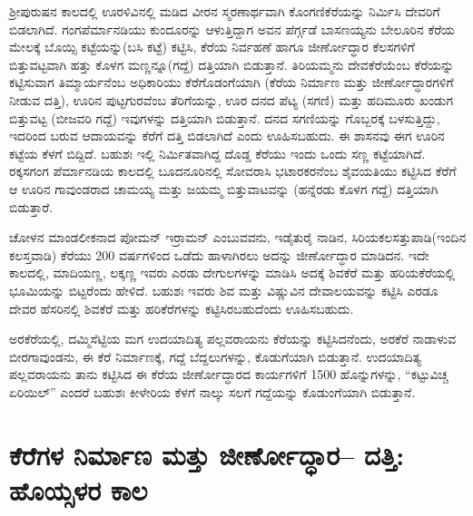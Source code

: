 ಶ‍್ರೀಪುರುಷನ ಕಾಲದಲ್ಲಿ ಊರಳಿವಿನಲ್ಲಿ ಮಡಿದ ವೀರನ ಸ್ಮರಣಾರ್ಥವಾಗಿ ಕೊಂಗಣಿಕೆರೆಯನ್ನು ನಿರ್ಮಿಸಿ ದೇವರಿಗೆ ಬಿಡಲಾಗಿದೆ. ಗಂಗಪೆರ್ಮಾನಡಿಯು ಕುಂದೂರನ್ನು ಆಳುತ್ತಿದ್ದಾಗ ಅವನ ಪೆರ್ಗ್ಗಡೆ ಬಾಸಣಯ್ಯನು ಬೇಲೂರಿನ ಕೆರೆಯ ಮೇಲಕ್ಕೆ ಬೊಯ್ಸಿ ಕಟ್ಟೆಯನ್ನು(ಬಸಿ ಕಟ್ಟೆ) ಕಟ್ಟಿಸಿ, ಕೆರೆಯ ನಿರ್ವಹಣೆ ಹಾಗೂ ಜೀರ್ಣೋದ್ಧಾರ ಕೆಲಸಗಳಿಗೆ ಬಿತ್ತುವಟ್ಟವಾಗಿ ಹತ್ತು ಕೊಳಗ ಮಣ್ಣನ್ನೂ(ಗದ್ದೆ) ದತ್ತಿಯಾಗಿ ಬಿಡುತ್ತಾನೆ. ತಿರಿಯಮ್ಮನು ದೇವಕೆರೆಯೆಂಬ ಕೆರೆಯನ್ನು ಕಟ್ಟಿಸುವಾಗ ತಿಮ್ಮಾರ್ಯನೆಂಬ ಅಧಿಕಾರಿಯು ಕೆರೆಗೊಡಂಗೆಯಾಗಿ (ಕೆರೆಯ ನಿರ್ಮಾಣ ಮತ್ತು ಜೀರ್ಣೋದ್ಧಾರಗಳಿಗೆ ನೀಡುವ ದತ್ತಿ), ಊರಿನ ಪುಟ್ಟಗುರವೆಂಬ ತೆರಿಗೆಯನ್ನು, ಊರ ದನದ ಪೆಟ್ಯ (ಸಗಣಿ) ಮತ್ತು ಹದಿಮೂರು ಖಂಡುಗ ಬಿತ್ತುವಟ್ಟ (ಬೀಜವರಿ ಗದ್ದೆ) ಇವುಗಳನ್ನು ದತ್ತಿಯಾಗಿ ಬಿಡುತ್ತಾನೆ. ದನದ ಸಗಣಿಯನ್ನು ಗೊಬ್ಬರಕ್ಕೆ ಬಳಸುತ್ತಿದ್ದು, ಇದರಿಂದ ಬರುವ ಆದಾಯವನ್ನು ಕೆರೆಗೆ ದತ್ತಿ ಬಿಡಲಾಗಿದೆ ಎಂದು ಊಹಿಸಬಹುದು. ಈ ಶಾಸನವು ಈಗ ಊರಿನ ಕಟ್ಟೆಯ ಕೆಳಗೆ ಬಿದ್ದಿದೆ. ಬಹುಶಃ ಇಲ್ಲಿ ನಿರ್ಮಿತವಾಗಿದ್ದ ದೊಡ್ಡ ಕೆರೆಯು ಇಂದು ಒಂದು ಸಣ್ಣ ಕಟ್ಟೆಯಾಗಿದೆ. ರಕ್ಕಸಗಂಗ ಪೆರ್ಮಾನಡಿಯ ಕಾಲದಲ್ಲಿ ಬೂದನೂರಿನಲ್ಲಿ ಸೋವರಾಸಿ ಭಟಾರಕರನೆಂಬ ಶೈವಯತಿಯು ಕಟ್ಟಿಸಿದ ಕೆರೆಗೆ ಆ ಊರಿನ ಗಾವುಂಡರಾದ ಚಾಮಯ್ಯ ಮತ್ತು ಜಯಮ್ಮ ಬಿತ್ತುವಾಟವನ್ನು (ಹನ್ನೆರಡು ಕೊಳಗ ಗದ್ದೆ) ದತ್ತಿಯಾಗಿ ಬಿಡುತ್ತಾರೆ.

ಚೋಳನ ಮಾಂಡಲೀಕನಾದ ಪೋಮನ್​ ಇರ್ರಾಮನ್​ ಎಂಬುವವನು, ಇಡೈತುರೈ ನಾಡಿನ, ಸಿರಿಯಕಲಸತ್ತುಪಾಡಿ(ಇಂದಿನ ಕಲಸ್ತವಾಡಿ) ಕೆರೆಯು 200 ವರ್ಷಗಳಿಂದ ಒಡೆದು ಹಾಳಾಗಿರಲು ಅದನ್ನು ಜೀರ್ಣೋದ್ಧಾರ ಮಾಡಿದನ. ಇದೇ ಕಾಲದಲ್ಲಿ, ಮಾದಿಯಣ್ಣ, ಲಕ್ಕಣ್ಣ ಇವರು ಎರಡು ದೇಗುಲಗಳನ್ನು ಮಾಡಿಸಿ ಅದಕ್ಕೆ ಶಿವಕೆರೆ ಮತ್ತು ಹರಿಯಕೆರೆಯಲ್ಲಿ ಭೂಮಿಯನ್ನು ಬಿಟ್ಟರೆಂದು ಹೇಳಿದೆ. ಬಹುಶಃ ಇವರು ಶಿವ ಮತ್ತು ವಿಷ್ಣುವಿನ ದೇವಾಲಯವನ್ನು ಕಟ್ಟಿಸಿ ಎರಡೂ ದೇವರ ಹೆಸರಿನಲ್ಲಿ ಶಿವಕೆರೆ ಮತ್ತು ಹರಿಕೆರೆಗಳನ್ನು ಕಟ್ಟಿಸಿರಬಹುದೆಂದು ಊಹಿಸಬಹುದು.

ಅರಕೆರೆಯಲ್ಲಿ, ದಮ್ಮಿಸೆಟ್ಟಿಯ ಮಗ ಉದಯಾದಿತ್ಯ ಪಲ್ಲವರಾಯನು ಕೆರೆಯನ್ನು ಕಟ್ಟಿಸಿದನೆಂದು, ಅರಕೆರೆ ನಾಡಾಳುವ ಬೀರಗಾವುಂಡನು, ಈ ಕೆರೆ ನಿರ್ಮಾಣಕ್ಕೆ, ಗದ್ದೆ ಬೆದ್ದಲುಗಳನ್ನು, ಕೊಡುಗೆಯಾಗಿ ಬಿಡುತ್ತಾನೆ. ಉದಯಾದಿತ್ಯ ಪಲ್ಲವರಾಯನು ತಾನು ಕಟ್ಟಿಸಿದ ಈ ಕೆರೆಯ ಜೀರ್ಣೋದ್ಧಾರದ ಕಾರ್ಯಗಳಿಗೆ 1500 ಹೊನ್ನುಗಳನ್ನು, “ಕಟ್ಟುವಿಚ್ಚ ಏರಿಯಿಲ್​” ಎಂದರೆ ಬಹುಶಃ ಕೀಳೇರಿಯ ಕೆಳಗೆ ನಾಲ್ಕು ಸಲಗೆ ಗದ್ದೆಯನ್ನು ಕೊಡುಂಗೆಯಾಗಿ ಬಿಡುತ್ತಾನೆ.


\section{ಕೆರೆಗಳ ನಿರ್ಮಾಣ ಮತ್ತು ಜೀರ್ಣೋದ್ಧಾರ– ದತ್ತಿ: ಹೊಯ್ಸಳರ ಕಾಲ}

